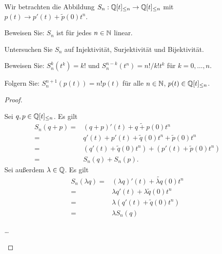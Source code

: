 \begin{Problem}
	Wir betrachten die Abbildung $S_n:\mathbb{Q}[t]_{\le n}\to \mathbb{Q}[t]_{\le n}$ mit $p(t)\to p'(t)+\tilde{p}(0)t^n$.
	\begin{parts}
	\item Beweisen Sie: $S_n$ ist f\"{u}r jedes $n\in \mathbb{N}$ linear.
	\item Untersuchen Sie $S_n$ auf Injektivität, Surjektivität und Bijektivität.
	\item Beweisen Sie: $S_n^k(t^k)=k!$ und $S_n^{n-k}(t^n)=n! / k!t^k$ f\"{u}r $k=0,\dots,n$.
	\item Folgern Sie: $S_n^{n+1}(p(t))=n!p(t)$ f\"{u}r alle $n\in \mathbb{N}$, $p(t)\in \mathbb{Q}[t]_{\le n}$.
	\end{parts}
\end{Problem}
\begin{proof}
	\begin{parts}
	\item Sei $q,p\in \mathbb{Q}[t]_{\le n}$. Es gilt
		\begin{align*}
			S_n(q+p)=&(q+p)'(t)+\widetilde{q+p}(0)t^n\\
			=&q'(t)+p'(t)+\tilde{q}(0)t^n+\tilde{p}(0)t^n\\
			=&(q'(t)+\tilde{q}(0)t^n)+(p'(t)+\tilde{p}(0)t^n)\\
			=&S_n(q)+S_n(p).
		\end{align*}
		Sei außerdem $\lambda\in \mathbb{Q}$. Es gilt
		\begin{align*}
			S_n(\lambda q)=&(\lambda q)'(t)+\widetilde{\lambda q}(0)t^n\\
			=&\lambda q'(t)+\lambda\tilde{q}(0)t^n\\
			=&\lambda\left( q'(t)+\tilde{q}(0)t^n \right) \\
			=&\lambda S_n(q)
		\end{align*}
	\item \ldots
	\end{parts}
\end{proof}
